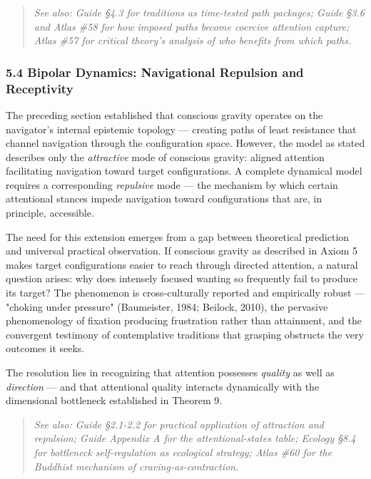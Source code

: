 \begin{quote}
\itshape
\textit{See also: Guide §4.3 for traditions as time-tested path packages; Guide §3.6 and Atlas \#58 for how imposed paths become coercive attention capture; Atlas \#57 for critical theory's analysis of who benefits from which paths.}
\end{quote}


\subsubsection*{5.4 Bipolar Dynamics: Navigational Repulsion and Receptivity}


The preceding section established that conscious gravity operates on the navigator's internal epistemic topology — creating paths of least resistance that channel navigation through the configuration space. However, the model as stated describes only the \textit{attractive} mode of conscious gravity: aligned attention facilitating navigation toward target configurations. A complete dynamical model requires a corresponding \textit{repulsive} mode — the mechanism by which certain attentional stances impede navigation toward configurations that are, in principle, accessible.


The need for this extension emerges from a gap between theoretical prediction and universal practical observation. If conscious gravity as described in Axiom 5 makes target configurations easier to reach through directed attention, a natural question arises: why does intensely focused wanting so frequently fail to produce its target? The phenomenon is cross-culturally reported and empirically robust — "choking under pressure" (Baumeister, 1984; Beilock, 2010), the pervasive phenomenology of fixation producing frustration rather than attainment, and the convergent testimony of contemplative traditions that grasping obstructs the very outcomes it seeks.


The resolution lies in recognizing that attention possesses \textit{quality} as well as \textit{direction} — and that attentional quality interacts dynamically with the dimensional bottleneck established in Theorem 9.


\begin{quote}
\itshape
\textit{See also: Guide §2.1-2.2 for practical application of attraction and repulsion; Guide Appendix A for the attentional-states table; Ecology §8.4 for bottleneck self-regulation as ecological strategy; Atlas \#60 for the Buddhist mechanism of craving-as-contraction.}
\end{quote}


